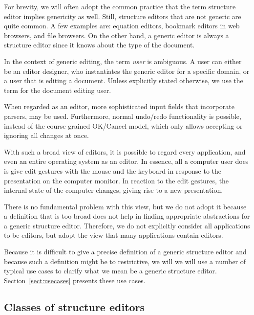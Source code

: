 For brevity, we will often adopt the common practice that the term structure editor implies genericity as well. Still, structure editors that are not generic are quite common. A few examples are: equation editors, bookmark editors in web browsers, and file browsers. On the other hand, a generic editor is always a structure editor since it knows about the type of the document.



In the context of generic editing, the term {\em user} is ambiguous. A user can either be an editor designer, who instantiates the generic editor for a specific domain, or a user that is editing a document. Unless explicitly stated otherwise, we use the term for the document editing user.


\bc
When regarded as an editor, more sophisticated input fields that incorporate parsers, may be used. Furthermore, normal undo/redo functionality is possible, instead of the course grained OK/Cancel model, which only allows accepting or ignoring all changes at once.
\ec

\bc
With such a broad view of editors, it is possible to regard every application, and even an entire operating system as an editor. In essence, all a computer user does is give edit gestures with the mouse and the keyboard in response to the presentation on the computer monitor. In reaction to the edit gestures, the internal state of the computer changes, giving rise to a new presentation. 

There is no fundamental problem with this view, but we do not adopt it because a definition that is too broad does not help in finding appropriate abstractions for a generic structure editor. Therefore, we do not explicitly consider all applications to be editors, but adopt the view that many applications contain editors.
\ec


Because it is difficult to give a precise definition of a generic structure editor and because such a definition might be to restrictive, we will we will use a number of typical use cases to clarify what we mean be a generic structure editor. Section~\ref{sect:usecases} presents these use cases.


%								
\subsection{Classes of structure editors}


